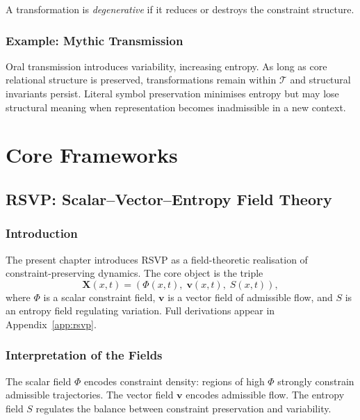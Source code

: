 \documentclass[11pt,openany]{book}
\begin{document}
\begin{definition}
\label{def:degenerative}
A transformation is \emph{degenerative} if it reduces or
destroys the constraint structure.
\end{definition}

\section{Example: Mythic Transmission}
\label{sec:myth}

Oral transmission introduces variability, increasing
entropy. As long as core relational structure is preserved,
transformations remain within $\mathcal{T}$ and structural
invariants persist. Literal symbol preservation minimises
entropy but may lose structural meaning when representation
becomes inadmissible in a new context.



\part{Core Frameworks}

\chapter{RSVP: Scalar--Vector--Entropy Field Theory}
\label{ch:rsvp}

\section{Introduction}
\label{sec:introduction-rsvp}

The present chapter introduces RSVP as a field-theoretic
realisation of constraint-preserving dynamics. The core
object is the triple
\[
  \mathbf{X}(x,t) = (\Phi(x,t),\; \boldsymbol{v}(x,t),\;
    S(x,t)),
\]
where $\Phi$ is a scalar constraint field, $\boldsymbol{v}$
is a vector field of admissible flow, and $S$ is an entropy
field regulating variation. Full derivations appear in
Appendix~\ref{app:rsvp}.

\section{Interpretation of the Fields}
\label{sec:interpretation}

The scalar field $\Phi$ encodes constraint density: regions
of high $\Phi$ strongly constrain admissible trajectories.
The vector field $\boldsymbol{v}$ encodes admissible flow.
The entropy field $S$ regulates the balance between
constraint preservation and variability.
\end{document}
